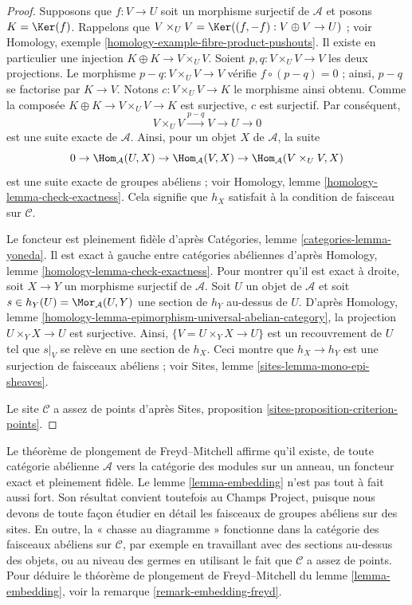 \begin{proof}
Supposons que $f : V \to U$ soit un morphisme surjectif de $\mathcal{A}$ et
posons $K = \Ker(f)$. Rappelons que
$V \times_U V = \Ker((f, -f) : V \oplus V \to U)$ ; voir
Homology, exemple \ref{homology-example-fibre-product-pushouts}. Il existe en
particulier une injection $K \oplus K \to V \times_U V$. Soient
$p, q : V \times_U V \to V$ les deux projections. Le morphisme
$p - q : V \times_U V \to V$ vérifie $f \circ (p  - q) = 0$ ; ainsi,
$p - q$ se factorise par $K \to V$. Notons
$c : V \times_U V \to K$ le morphisme ainsi
obtenu. Comme la composée $K \oplus K \to V \times_U V \to K$ est
surjective, $c$ est surjectif. Par conséquent,
$$
V \times_U V \xrightarrow{p - q} V \to U \to 0
$$
est une suite exacte de $\mathcal{A}$. Ainsi, pour un objet $X$ de
$\mathcal{A}$, la suite
$$
0 \to
\Hom_\mathcal{A}(U, X) \to
\Hom_\mathcal{A}(V, X) \to
\Hom_\mathcal{A}(V \times_U V, X)
$$
est une suite exacte de groupes abéliens ; voir
Homology, lemme \ref{homology-lemma-check-exactness}. Cela signifie que $h_X$
satisfait à la condition de faisceau sur $\mathcal{C}$.

\medskip\noindent
Le foncteur est pleinement fidèle d'après
Catégories, lemme \ref{categories-lemma-yoneda}. Il est exact à gauche entre
catégories abéliennes d'après
Homology, lemme \ref{homology-lemma-check-exactness}. Pour montrer qu'il est
exact à droite, soit $X \to Y$ un morphisme surjectif de $\mathcal{A}$. Soit
$U$ un objet de $\mathcal{A}$ et soit
$s \in h_Y(U) = \Mor_\mathcal{A}(U, Y)$ une section de $h_Y$ au-dessus de
$U$. D'après
Homology, lemme \ref{homology-lemma-epimorphism-universal-abelian-category},
la projection $U \times_Y X \to U$ est surjective. Ainsi,
$\{V = U \times_Y X \to U\}$ est un recouvrement de $U$ tel que $s|_V$ se
relève en une section de $h_X$. Ceci montre que $h_X \to h_Y$ est une
surjection de faisceaux abéliens ; voir
Sites, lemme \ref{sites-lemma-mono-epi-sheaves}.

\medskip\noindent
Le site $\mathcal{C}$ a assez de points d'après
Sites, proposition \ref{sites-proposition-criterion-points}.
\end{proof}

\begin{remark}
\label{remark-embedding}
Le théorème de plongement de Freyd--Mitchell affirme qu'il existe, de toute
catégorie abélienne $\mathcal{A}$ vers la catégorie des modules sur un anneau,
un foncteur exact et pleinement fidèle. Le lemme \ref{lemma-embedding} n'est
pas tout à fait aussi fort. Son résultat convient toutefois au Champs Project,
puisque nous devons de toute façon étudier en détail les faisceaux de groupes
abéliens sur des sites. En outre, la « chasse au diagramme » fonctionne dans la
catégorie des faisceaux abéliens sur $\mathcal{C}$, par exemple en travaillant
avec des sections au-dessus des objets, ou au niveau des germes en utilisant le
fait que $\mathcal{C}$ a assez de points. Pour déduire le théorème de plongement
de Freyd--Mitchell du lemme \ref{lemma-embedding}, voir la
remarque \ref{remark-embedding-freyd}.
\end{remark}

